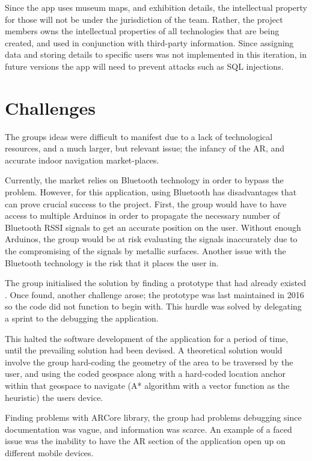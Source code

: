 Since the app uses museum maps, and exhibition details, the intellectual property for those will not be under the jurisdiction of the team. Rather, the project members owns the intellectual properties of all technologies that are being created, and used in conjunction with third-party information. Since assigning data and storing details to specific users was not implemented in this iteration, in future versions the app will need to prevent attacks such as SQL injections.

\section{Challenges}
The groups ideas were difficult to manifest due to a lack of technological resources, and a much larger, but relevant issue; the infancy of the AR, and accurate indoor navigation market-places.

Currently, the market relies on Bluetooth technology in order to bypass the problem. However, for this application, using Bluetooth has disadvantages that can prove crucial success to the project. First, the group would have to have access to multiple Arduinos in order to propagate the necessary number of Bluetooth RSSI signals to get an accurate position on the user. Without enough Arduinos, the group would be at risk evaluating the signals inaccurately due to the compromising of the signals by metallic surfaces. Another issue with the Bluetooth technology is the risk that it places the user in. 

The group initialised the solution by finding a prototype that had already existed \cite{smd}. Once found, another challenge arose; the prototype was last maintained in 2016 so the code did not function to begin with. This hurdle was solved by delegating a sprint to the debugging the application.

This halted the software development of the application for a period of time, until the prevailing solution had been devised. A theoretical solution would involve the group hard-coding the geometry of the area to be traversed by the user, and using the coded geospace along with a hard-coded location anchor within that geospace to navigate (A* algorithm with a vector function as the heuristic) the users device.

Finding problems with ARCore library, the group had problems debugging since documentation was vague, and information was scarce. An example of a faced issue was the inability to have the AR section of the application open up on different mobile devices.

